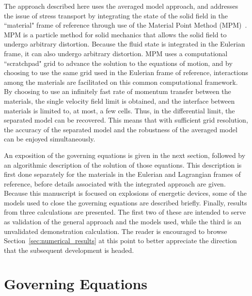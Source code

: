 The approach described here uses the averaged model approach, and addresses
the issue of stress transport by integrating the state of the solid field in 
the ``material" frame of reference through use of the Material Point 
Method (MPM)~\cite{Sulsky1994,Sulsky1995}.  MPM is a particle method for 
solid mechanics that allows the solid field to undergo arbitrary 
distortion.  Because the fluid state is integrated in the Eulerian frame, it 
can also undergo arbitrary distortion.  MPM uses a computational ``scratchpad" 
grid to advance the solution to the equations of motion, and by choosing to 
use the same grid used in the Eulerian frame of reference, interactions 
among the materials are facilitated on this common computational 
framework.  By choosing to use an infinitely fast rate of momentum transfer 
between the materials, the single velocity field limit is obtained, and the 
interface between materials is limited to, at most, a few cells.  Thus, in 
the differential limit, the separated model can be recovered.  This means 
that with sufficient grid resolution, the accuracy of the separated model 
and the robustness of the averaged model can be enjoyed simultaneously.

An exposition of the governing equations is given in the next section, 
followed by an algorithmic description of the solution of those 
equations.  This description is first done separately for the materials in 
the Eulerian and Lagrangian frames of reference, before details associated 
with the integrated approach are given.  Because this manuscript is focused 
on explosions of energetic devices, some of the models used to close the
governing equations are described briefly.  Finally, results from three 
calculations are presented.  The first two of these are intended to serve 
as validation of the general approach and the models used, while the third is 
an unvalidated demonstration calculation.  The reader is encouraged to 
browse Section~\ref{sec:numerical_results}  at this point to better appreciate
the direction that the subsequent development is headed.

\section{Governing Equations}\label{sec:governing_equations}

